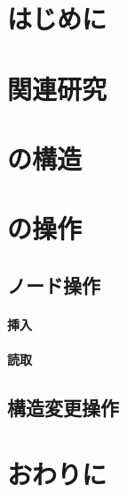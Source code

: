 
\section{はじめに}

\section{関連研究}

\section{\Bctree{}の構造}

\section{\Bctree{}の操作}

\subsection{ノード操作}

\paragraph{挿入}

\paragraph{読取}

\subsection{構造変更操作}

\section{おわりに}